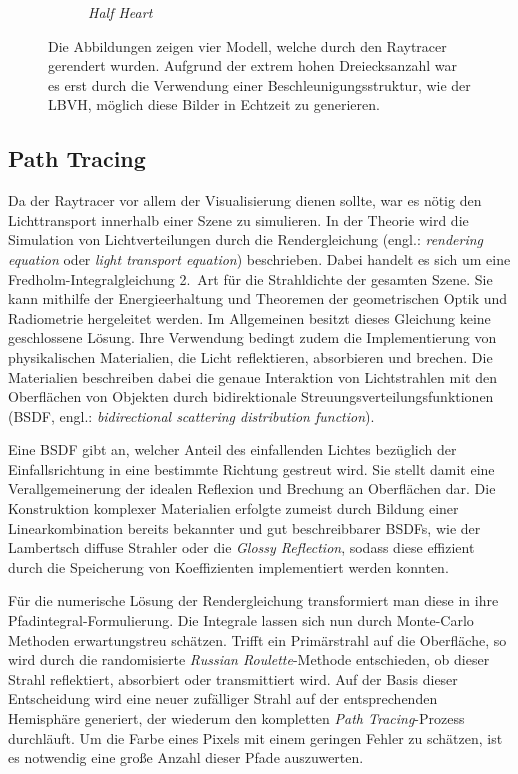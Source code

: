 \documentclass[crop=false]{standalone}
\begin{document}
\begin{figure}[h]
\begin{subfigure}[b]{0.24\textwidth}
          \caption{\textit{Half Heart}}
        \end{subfigure}
        \caption{%
          Die Abbildungen zeigen vier Modell, welche durch den Raytracer gerendert wurden.
          Aufgrund der extrem hohen Dreiecksanzahl war es erst durch die Verwendung einer Beschleunigungsstruktur, wie der LBVH, möglich diese Bilder in Echtzeit zu generieren.
        }
        \label{fig:lbvh-results}
      \end{figure}


    \subsection{Path Tracing} %
    \label{sub:path_tracing}
      Da der Raytracer vor allem der Visualisierung dienen sollte, war es nötig den Lichttransport innerhalb einer Szene zu simulieren.
      In der Theorie wird die Simulation von Lichtverteilungen durch die Rendergleichung (engl.: \textit{rendering equation} oder \textit{light transport equation}) beschrieben.
      Dabei handelt es sich um eine Fredholm-Integralgleichung 2.~Art für die Strahldichte der gesamten Szene.
      Sie kann mithilfe der Energieerhaltung und Theoremen der geometrischen Optik und Radiometrie hergeleitet werden.
      Im Allgemeinen besitzt dieses Gleichung keine geschlossene Lösung.
      Ihre Verwendung bedingt zudem die Implementierung von physikalischen Materialien, die Licht reflektieren, absorbieren und brechen.
      Die Materialien beschreiben dabei die genaue Interaktion von Lichtstrahlen mit den Oberflächen von Objekten durch bidirektionale Streuungsverteilungsfunktionen (BSDF, engl.: \textit{bidirectional scattering distribution function}).

      Eine BSDF gibt an, welcher Anteil des einfallenden Lichtes bezüglich der Einfallsrichtung in eine bestimmte Richtung gestreut wird.
      Sie stellt damit eine Verallgemeinerung der idealen Reflexion und Brechung an Oberflächen dar.
      Die Konstruktion komplexer Materialien erfolgte zumeist durch Bildung einer Linearkombination bereits bekannter und gut beschreibbarer BSDFs, wie der Lambertsch diffuse Strahler oder die \textit{Glossy Reflection}, sodass diese effizient durch die Speicherung von Koeffizienten implementiert werden konnten.

      Für die numerische Lösung der Rendergleichung transformiert man diese in ihre Pfadintegral-Formulierung.
      Die Integrale lassen sich nun durch Monte-Carlo Methoden erwartungstreu schätzen.
      Trifft ein Primärstrahl auf die Oberfläche, so wird durch die randomisierte \textit{Russian Roulette}-Methode entschieden, ob dieser Strahl reflektiert, absorbiert oder transmittiert wird.
      Auf der Basis dieser Entscheidung wird eine neuer zufälliger Strahl auf der entsprechenden Hemisphäre generiert, der wiederum den kompletten \textit{Path Tracing}-Prozess durchläuft.
      Um die Farbe eines Pixels mit einem geringen Fehler zu schätzen, ist es notwendig eine große Anzahl dieser Pfade auszuwerten.
\end{document}
